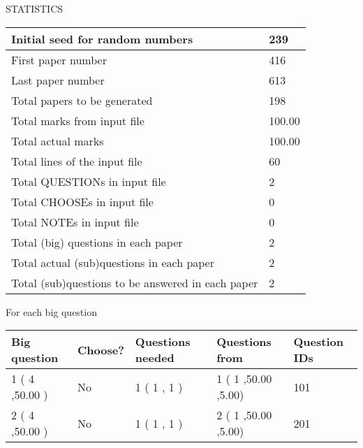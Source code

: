 \documentclass[12pt]{article}
\begin{document}
   
   
\vspace{0.2in}
\vspace{0.2in}
   
   
 \newpage
\setcounter{page}{1} 
   
   
 {\LARGE{STATISTICS}}
   
\vspace{0.2in}
   
 \begin{tabular}{|l|l|}
 \hline
 Initial seed for random numbers & 239  \\
\hline
 First paper number & 416  \\
\hline
 Last  paper number & 613  \\
\hline
 Total papers to be generated & 198  \\
\hline
Total marks from input file & 100.00 \\
\hline
Total actual marks & 100.00 \\
\hline
 Total lines of the input file & 60  \\
 \hline
 Total QUESTIONs in input file & 2  \\
\hline
 Total CHOOSEs in input file & 0  \\
\hline
 Total NOTEs in input file & 0  \\
\hline
 Total (big) questions in each paper & 2  \\
\hline
 Total actual (sub)questions in each paper & 2  \\
\hline
 Total (sub)questions to be answered in each paper & 2  \\
\hline
 \end{tabular}
   
   
 \newpage
   
{\LARGE{For each big question}}
   
   
\vspace{0.2in}
   
   
\noindent\hspace{-0.4in}\begin{tabular}{|l|l|l|l|l|}
\hline
 Big question & Choose? & Questions needed & Questions from & Question IDs \\ 
\hline
 1 ( 4 ,50.00
 ) &  No   & 
 1 ( 1 ,  1 ) &  1 ( 1
,50.00
 ,5.00) &  101  \\
 \hline
 2 ( 4 ,50.00
 ) &  No   & 
 1 ( 1 ,  1 ) &  2 ( 1
,50.00
 ,5.00) &  201  \\
 \hline
 \end{tabular}
 
 
\end{document}
